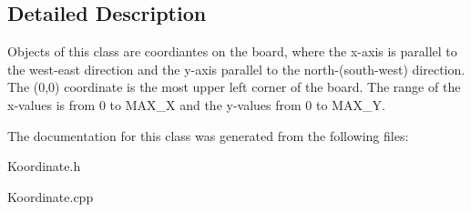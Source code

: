 \subsection{Detailed Description}
Objects of this class are coordiantes on the board, where the x-\/axis is parallel to the west-\/east direction and the y-\/axis parallel to the north-\/(south-\/west) direction. The (0,0) coordinate is the most upper left corner of the board. The range of the x-\/values is from 0 to M\-A\-X\-\_\-\-X and the y-\/values from 0 to M\-A\-X\-\_\-\-Y. 

The documentation for this class was generated from the following files\-:\begin{DoxyCompactItemize}
\item 
Koordinate.\-h\item 
Koordinate.\-cpp\end{DoxyCompactItemize}
